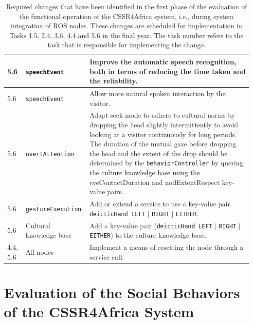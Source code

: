 \documentclass{CSSRforAfrica}
\begin{document}
\begin{center}
\begin{table}[H]
\begin{tabularx}{\linewidth}{| l | l | X |}
\hline
{\footnotesize 5.6 }  & {\footnotesize \verb+speechEvent+}     & {\footnotesize  Improve the automatic speech recognition, both in terms of reducing the time taken and the reliability.} \\ 
\hline
{\footnotesize 5.6 }  & {\footnotesize \verb+speechEvent+}     & {\footnotesize  Allow more natural spoken interaction by the visitor.} \\ 
\hline
{\footnotesize 5.6 }  & {\footnotesize \verb+overtAttention +}     & {\footnotesize  Adapt  seek mode to adhere to cultural norms by dropping the head slightly intermittently to avoid looking at a visitor continuously for long periods. The duration of the mutual gaze before dropping the head and the extent of  the drop should be determined by the \verb+behaviorController+ by quering the culture knowledge base using the eyeContactDuration  and nodExtentRespect key-value pairs.} \\ 
\hline
{\footnotesize 5.6 }  & {\footnotesize \verb+gestureExecution+}     & {\footnotesize Add or extend a service to use a key-value pair \verb+deicticHand LEFT+ $\mid$ \verb+RIGHT+ $\mid$ \verb+EITHER+. } \\ 
\hline
{\footnotesize 5.6 }  & {\footnotesize Cultural knowledge base}     & {\footnotesize  Add a key-value pair (\verb+deicticHand LEFT+ $\mid$ \verb+RIGHT+ $\mid$ \verb+EITHER+) to the culture knowledge base.  } \\ 
\hline
{\footnotesize 4.4, 5.6 }  & {\footnotesize All nodes}     & {\footnotesize  Implement  a means of resetting the node through a service call.} \\
\hline
\end{tabularx}
\caption{Required changes that have been identified in the first phase of the evaluation of the functional operation of the CSSR4Africa system, i.e., during system integration of ROS nodes. These changes are scheduled for implementation in Tasks  1.5, 2.4, 3.6,  4.4 and 5.6 in the final year. The task number refers to the task that is responsible for implementing the change.}
\label{table:phase1b}
\end{table}
\end{center}



\section{Evaluation of the Social Behaviors of the CSSR4Africa System}
 \label{section:social_evaluation}
\end{document}
